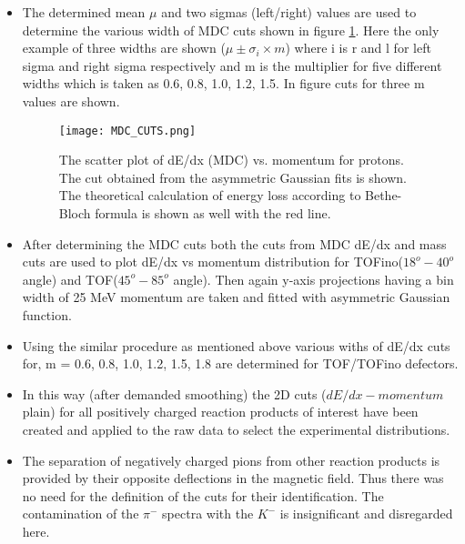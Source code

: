 \begin{itemize}
   \item The determined mean $\mu$ and two sigmas (left/right) values are used to determine the various width of MDC cuts shown in figure \ref{MDCcut}. Here the only example of three widths are shown ($\mu \pm \sigma_i \times m$) where i is r and l for left sigma and right sigma respectively and m is the multiplier for five different widths which is taken as 0.6, 0.8, 1.0, 1.2, 1.5. In figure cuts for three m values are shown.
   \begin{figure}
   	\centering
   	\texttt{[image: MDC\_CUTS.png]}
   	\caption{The scatter plot of dE/dx (MDC) vs. momentum for protons. The cut obtained from 
   		the asymmetric Gaussian fits is shown. The theoretical calculation of energy loss according to Bethe-Bloch formula is shown as well with the red line.}
   	\label{MDCcut}
   \end{figure}
  \item After determining the MDC cuts both the cuts from MDC  dE/dx and mass cuts are used to plot dE/dx vs momentum distribution for TOFino($18^o-40^o$ angle) and TOF($45^o-85^o$ angle). Then again y-axis projections having a bin width of 25 MeV momentum are taken and fitted with asymmetric Gaussian function.
  \item Using the similar procedure as mentioned above various withs of dE/dx cuts for, m = 0.6, 0.8, 1.0, 1.2, 1.5, 1.8 are determined for TOF/TOFino defectors.
  \item In this way (after demanded smoothing) the 2D cuts ($dE/dx - momentum$ plain) for all positively charged reaction products of interest have been created and applied to the raw data to select the experimental distributions.
  \item The separation of negatively charged pions from other reaction products is provided by their opposite deflections in the magnetic field. Thus there was no need for the definition of the cuts for their identification. The contamination of the $\pi^{-}$ spectra with the $K^{-}$ is insignificant and disregarded here.
\end{itemize}


